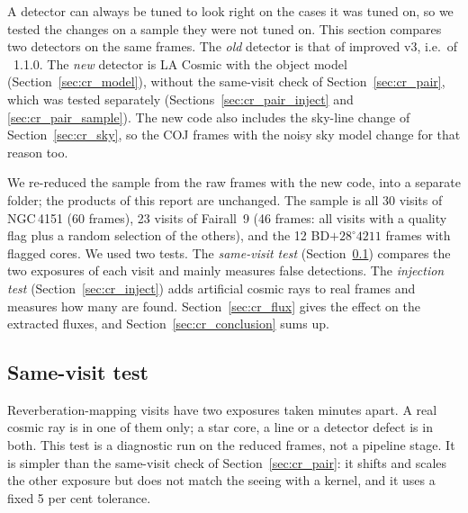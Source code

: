 A detector can always be tuned to look right on the cases it was tuned on, so we tested the changes on a sample they
were not tuned on. This section compares two detectors on the same frames. The \textit{old} detector is that of
improved v3, i.e.\ of \banzai{}~1.1.0. The \textit{new} detector is LA Cosmic with the object model
(Section~\ref{sec:cr_model}), without the same-visit check of Section~\ref{sec:cr_pair}, which was tested separately
(Sections~\ref{sec:cr_pair_inject} and \ref{sec:cr_pair_sample}). The new code also includes the sky-line change of
Section~\ref{sec:cr_sky}, so the COJ frames with the noisy sky model change for that reason too.

We re-reduced the sample from the raw frames with the new code, into a separate folder; the products of this report
are unchanged. The sample is all 30 visits of NGC\,4151 (60 frames), 23 visits of Fairall~9 (46 frames: all visits
with a quality flag plus a random selection of the others), and the 12 BD$+28^\circ4211$ frames with flagged cores. We
used two tests. The \textit{same-visit test} (Section~\ref{sec:cr_pairs}) compares the two exposures of each visit and
mainly measures false detections. The \textit{injection test} (Section~\ref{sec:cr_inject}) adds artificial cosmic rays
to real frames and measures how many are found. Section~\ref{sec:cr_flux} gives the effect on the extracted fluxes,
and Section~\ref{sec:cr_conclusion} sums up.

\subsection{Same-visit test}
\label{sec:cr_pairs}
Reverberation-mapping visits have two exposures taken minutes apart. A real cosmic ray is in one of them only; a star
core, a line or a detector defect is in both. This test is a diagnostic run on the reduced frames, not a pipeline stage.
It is simpler than the same-visit check of Section~\ref{sec:cr_pair}: it shifts and scales the other exposure but does
not match the seeing with a kernel, and it uses a fixed 5 per cent tolerance.

